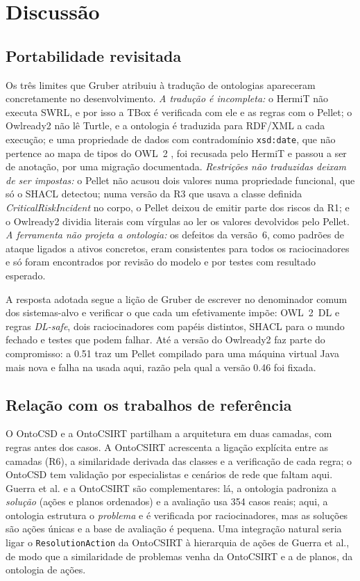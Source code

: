 \documentclass[12pt]{article}
\newcommand{\oc}[1]{\texttt{#1}}
\begin{document}
\section{Discussão}
\label{sec:disc}

\subsection{Portabilidade revisitada}
\label{sec:portab}

Os três limites que Gruber atribuiu à tradução de ontologias \cite{gruber1993} apareceram concretamente no desenvolvimento. \emph{A tradução é incompleta:} o HermiT não executa SWRL, e por isso a TBox é verificada com ele e as regras com o Pellet; o Owlready2 não lê Turtle, e a ontologia é traduzida para RDF/XML a cada execução; e uma propriedade de dados com contradomínio \texttt{xsd:date}, que não pertence ao mapa de tipos do OWL~2 \cite{owl2}, foi recusada pelo HermiT e passou a ser de anotação, por uma migração documentada. \emph{Restrições não traduzidas deixam de ser impostas:} o Pellet não acusou dois valores numa propriedade funcional, que só o SHACL detectou; numa versão da R3 que usava a classe definida \emph{CriticalRiskIncident} no corpo, o Pellet deixou de emitir parte dos riscos da R1; e o Owlready2 dividia literais com vírgulas ao ler os valores devolvidos pelo Pellet. \emph{A ferramenta não projeta a ontologia:} os defeitos da versão~6, como padrões de ataque ligados a ativos concretos, eram consistentes para todos os raciocinadores e só foram encontrados por revisão do modelo e por testes com resultado esperado.

A resposta adotada segue a lição de Gruber de escrever no denominador comum dos sistemas-alvo e verificar o que cada um efetivamente impõe: OWL~2~DL e regras \emph{DL-safe}, dois raciocinadores com papéis distintos, SHACL para o mundo fechado e testes que podem falhar. Até a versão do Owlready2 faz parte do compromisso: a 0.51 traz um Pellet compilado para uma máquina virtual Java mais nova e falha na usada aqui, razão pela qual a versão 0.46 foi fixada.

\subsection{Relação com os trabalhos de referência}

O OntoCSD e a OntoCSIRT partilham a arquitetura em duas camadas, com regras antes dos casos. A OntoCSIRT acrescenta a ligação explícita entre as camadas (R6), a similaridade derivada das classes e a verificação de cada regra; o OntoCSD tem validação por especialistas e cenários de rede que faltam aqui. Guerra et al. e a OntoCSIRT são complementares: lá, a ontologia padroniza a \emph{solução} (ações e planos ordenados) e a avaliação usa 354 casos reais; aqui, a ontologia estrutura o \emph{problema} e é verificada por raciocinadores, mas as soluções são ações únicas e a base de avaliação é pequena. Uma integração natural seria ligar o \oc{ResolutionAction} da OntoCSIRT à hierarquia de ações de Guerra et al., de modo que a similaridade de problemas venha da OntoCSIRT e a de planos, da ontologia de ações.
\end{document}
